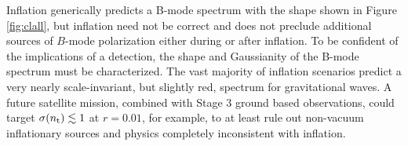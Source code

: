 Inflation generically predicts a B-mode spectrum with the shape shown in Figure \ref{fig:clall}, but inflation need not be correct \cite{} and does not preclude additional sources of $B$-mode polarization either during or after inflation. To be confident of the implications of a detection, the shape and Gaussianity of the B-mode spectrum must be characterized. 
The vast majority of inflation scenarios predict a very nearly scale-invariant, but slightly red, spectrum for gravitational waves. A future satellite mission, combined with Stage 3 ground based observations, could target $\sigma(n_{\rm t})\lesssim1$ at $r=0.01$, for example, to at least rule out non-vacuum inflationary sources  \cite{Namba:2015gja,Peloso:2016gqs} and physics completely inconsistent with inflation. 



